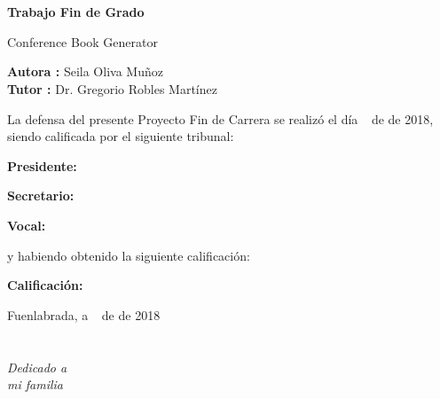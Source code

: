 \documentclass[a4paper, 12pt]{book}
\begin{document}
\newpage
\mbox{}
\thispagestyle{empty} %


\clearpage
{}
\chapter*{}

\vspace{-4cm}
\begin{center}
\LARGE
\textbf{Trabajo Fin de Grado}

\vspace{1cm}
\large
Conference Book Generator

\vspace{1cm}
\large
\textbf{Autora :} Seila Oliva Muñoz \\
\textbf{Tutor :} Dr. Gregorio Robles Martínez

\end{center}

\vspace{1cm}
La defensa del presente Proyecto Fin de Carrera se realizó el día \qquad$\;\,$ de \qquad\qquad\qquad\qquad \newline de 2018, siendo calificada por el siguiente tribunal:


\vspace{0.5cm}
\textbf{Presidente:}

\vspace{1.2cm}
\textbf{Secretario:}

\vspace{1.2cm}
\textbf{Vocal:}


\vspace{1.2cm}
y habiendo obtenido la siguiente calificación:

\vspace{1cm}
\textbf{Calificación:}


\vspace{1cm}
\begin{flushright}
Fuenlabrada, a \qquad$\;\,$ de \qquad\qquad\qquad\qquad de 2018
\end{flushright}


\chapter*{}
\begin{flushright}
\textit{Dedicado a \\
mi familia}
\end{flushright}
\end{document}
